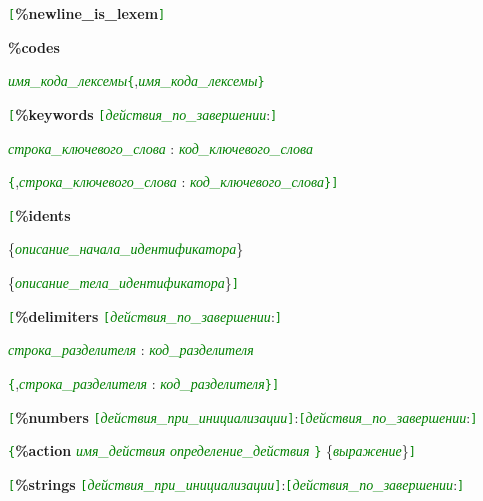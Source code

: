 \documentclass[10pt]{report}
\begin{document}
\noindent%
\texttt{\textcolor{Green}{[}}\textbf{\%newline_is_lexem}\texttt{\textcolor{Green}{]}} 

\noindent%
\textbf{\%codes}

\textcolor{Green}{\textit{имя_кода_лексемы}}\texttt{\textcolor{Green}{\{}},\textcolor{Green}{\textit{имя_кода_лексемы}}\texttt{\textcolor{Green}{\}}}

\noindent%
\texttt{\textcolor{Green}{[}}\textbf{\%keywords} \texttt{\textcolor{Green}{[}}\textcolor{Green}{\textit{действия_по_завершении}}:\texttt{\textcolor{Green}{]}}

\textcolor{Green}{\textit{строка_ключевого_слова}} : \textcolor{Green}{\textit{код_ключевого_слова}}

\texttt{\textcolor{Green}{\{}},\textcolor{Green}{\textit{строка_ключевого_слова}} : \textcolor{Green}{\textit{код_ключевого_слова}}\texttt{\textcolor{Green}{\}}}\texttt{\textcolor{Green}{]}}

\noindent%
\texttt{\textcolor{Green}{[}}\textbf{\%idents}

\{\textcolor{Green}{\textit{описание_начала_идентификатора}}\}

\{\textcolor{Green}{\textit{описание_тела_идентификатора}}\}\texttt{\textcolor{Green}{]}}

\noindent%
\texttt{\textcolor{Green}{[}}\textbf{\%delimiters} \texttt{\textcolor{Green}{[}}\textcolor{Green}{\textit{действия_по_завершении}}:\texttt{\textcolor{Green}{]}}

\textcolor{Green}{\textit{строка_разделителя}} : \textcolor{Green}{\textit{код_разделителя}}

\texttt{\textcolor{Green}{\{}},\textcolor{Green}{\textit{строка_разделителя}} : \textcolor{Green}{\textit{код_разделителя}}\texttt{\textcolor{Green}{\}}}\texttt{\textcolor{Green}{]}}

\noindent%
\texttt{\textcolor{Green}{[}}\textbf{\%numbers} \texttt{\textcolor{Green}{[}}\textcolor{Green}{\textit{действия_при_инициализации}}\texttt{\textcolor{Green}{]}}:\texttt{\textcolor{Green}{[}}\textcolor{Green}{\textit{действия_по_завершении}}:\texttt{\textcolor{Green}{]}} 

\texttt{\textcolor{Green}{\{}}\textbf{\%action} \textcolor{Green}{\textit{имя_действия}} \textcolor{Green}{\textit{определение_действия}} \texttt{\textcolor{Green}{\}}}
\{\textcolor{Green}{\textit{выражение}}\}\texttt{\textcolor{Green}{]}}

\noindent%
\texttt{\textcolor{Green}{[}}\textbf{\%strings} \texttt{\textcolor{Green}{[}}\textcolor{Green}{\textit{действия_при_инициализации}}\texttt{\textcolor{Green}{]}}:\texttt{\textcolor{Green}{[}}\textcolor{Green}{\textit{действия_по_завершении}}:\texttt{\textcolor{Green}{]}} 
\end{document}
